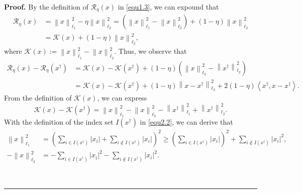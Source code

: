\documentclass[a4paper,12pt]{article}
\numberwithin{equation}{section}
\newenvironment{proof}[1][Proof]{\textbf{#1.} }
{\ \rule{0.75em}{0.75em}\smallskip}
\begin{document}
\begin{proof}
    By the definition of $\mathcal{R}_{\eta}\left(x\right)$ in \eqref{equ1.3}, we can expound that 
    \begin{align*}
        \mathcal{R}_{\eta}\left(x\right)
        & = \left\|x\right\|_{\ell_{1}}^{2}-\eta\left\|x\right\|_{\ell_{2}}^{2} = \left(\left\|x\right\|_{\ell_{1}}^{2}-\left\|x\right\|_{\ell_{2}}^{2}\right) +\left(1-\eta\right)\left\|x\right\|_{\ell_{2}}^{2} \\
        & = \mathcal{K}\left(x\right)+\left(1-\eta\right)\left\|x\right\|_{\ell_{2}}^{2},
    \end{align*}
    where $\mathcal{K}\left(x\right):=\left\|x\right\|_{\ell_{1}}^{2}- \left\|x\right\|_{\ell_{2}}^{2}$. Thus, we observe that 
    \begin{align}\label{equ3.7}
        \mathcal{R}_{\eta}\left(x\right)-\mathcal{R}_{\eta}\left(x^{\dagger}\right)
        & = \mathcal{K}\left(x\right)-\mathcal{K}\left(x^{\dagger}\right) +\left(1-\eta\right)\left(\left\|x\right\|_{\ell_{2}}^{2}- \left\|x^{\dagger}\right\|_{\ell_{2}}^{2}\right) \nonumber\\
        & = \mathcal{K}\left(x\right)-\mathcal{K}\left(x^{\dagger}\right) +\left(1-\eta\right)\left\|x-x^{\dagger}\right\|_{\ell_{2}}^{2} +2\left(1-\eta\right)\left<x^{\dagger}, x-x^{\dagger}\right>.  
    \end{align}
    From the definition of $\mathcal{K}\left(x\right)$, we can express
    \begin{equation*}
        \mathcal{K}\left(x\right)-\mathcal{K}\left(x^{\dagger}\right) = \left\|x\right\|_{\ell_{1}}^{2}-\left\|x\right\|_{\ell_{2}}^{2} - \left\|x^{\dagger}\right\|_{\ell_{1}}^{2}+ \left\|x^{\dagger}\right\|_{\ell_{2}}^{2}.
    \end{equation*}
    With the definition of the index set $I\left(x^{\dagger}\right)$ in \eqref{equ2.2}, we can derive that
    \begin{align*}
      \left\|x\right\|_{\ell_{1}}^{2} & = \left(\sum_{i\in I\left(x^{\dagger}\right)} \left|x_{i}\right| + \sum_{i\notin I\left(x^{\dagger}\right)}\left|x_{i}\right| \right)^{2} \geq \left(\sum_{i\in I\left(x^{\dagger}\right)} \left|x_{i}\right| \right)^{2} + \sum_{i\notin I\left(x^{\dagger}\right)}\left|x_{i}\right|^{2}, \\
      -\left\|x\right\|_{\ell_{2}}^{2} & = -\sum_{i\in I\left(x^{\dagger}\right)} \left|x_{i}\right|^{2} - \sum_{i\notin I\left(x^{\dagger}\right)} \left|x_{i}\right|^{2}.
    \end{align*}

\end{proof}
\end{document}
